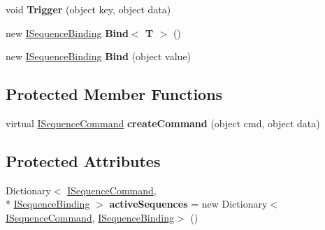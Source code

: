 \begin{DoxyCompactItemize}
\item 
\hypertarget{classbabel_1_1extensions_1_1sequencer_1_1impl_1_1_sequencer_a40c75d57c82d7d5c5817ad66e3271922}{void {\bfseries Trigger} (object key, object data)}\label{classbabel_1_1extensions_1_1sequencer_1_1impl_1_1_sequencer_a40c75d57c82d7d5c5817ad66e3271922}

\item 
\hypertarget{classbabel_1_1extensions_1_1sequencer_1_1impl_1_1_sequencer_a8f884e8108088e05a7ad09eb4dbb7fe9}{new \hyperlink{interfacebabel_1_1extensions_1_1sequencer_1_1api_1_1_i_sequence_binding}{I\-Sequence\-Binding} {\bfseries Bind$<$ T $>$} ()}\label{classbabel_1_1extensions_1_1sequencer_1_1impl_1_1_sequencer_a8f884e8108088e05a7ad09eb4dbb7fe9}

\item 
\hypertarget{classbabel_1_1extensions_1_1sequencer_1_1impl_1_1_sequencer_a198a976870191e488b5030e5a79b3c38}{new \hyperlink{interfacebabel_1_1extensions_1_1sequencer_1_1api_1_1_i_sequence_binding}{I\-Sequence\-Binding} {\bfseries Bind} (object value)}\label{classbabel_1_1extensions_1_1sequencer_1_1impl_1_1_sequencer_a198a976870191e488b5030e5a79b3c38}

\end{DoxyCompactItemize}
\subsection*{Protected Member Functions}
\begin{DoxyCompactItemize}
\item 
\hypertarget{classbabel_1_1extensions_1_1sequencer_1_1impl_1_1_sequencer_a16a293250e86f2cfaa7061e0622c6af1}{virtual \hyperlink{interfacebabel_1_1extensions_1_1sequencer_1_1api_1_1_i_sequence_command}{I\-Sequence\-Command} {\bfseries create\-Command} (object cmd, object data)}\label{classbabel_1_1extensions_1_1sequencer_1_1impl_1_1_sequencer_a16a293250e86f2cfaa7061e0622c6af1}

\end{DoxyCompactItemize}
\subsection*{Protected Attributes}
\begin{DoxyCompactItemize}
\item 
\hypertarget{classbabel_1_1extensions_1_1sequencer_1_1impl_1_1_sequencer_a4faf0585ed885b986a904da797bdb22a}{Dictionary$<$ \hyperlink{interfacebabel_1_1extensions_1_1sequencer_1_1api_1_1_i_sequence_command}{I\-Sequence\-Command}, \\*
\hyperlink{interfacebabel_1_1extensions_1_1sequencer_1_1api_1_1_i_sequence_binding}{I\-Sequence\-Binding} $>$ {\bfseries active\-Sequences} = new Dictionary$<$\hyperlink{interfacebabel_1_1extensions_1_1sequencer_1_1api_1_1_i_sequence_command}{I\-Sequence\-Command}, \hyperlink{interfacebabel_1_1extensions_1_1sequencer_1_1api_1_1_i_sequence_binding}{I\-Sequence\-Binding}$>$ ()}\label{classbabel_1_1extensions_1_1sequencer_1_1impl_1_1_sequencer_a4faf0585ed885b986a904da797bdb22a}

\end{DoxyCompactItemize}
